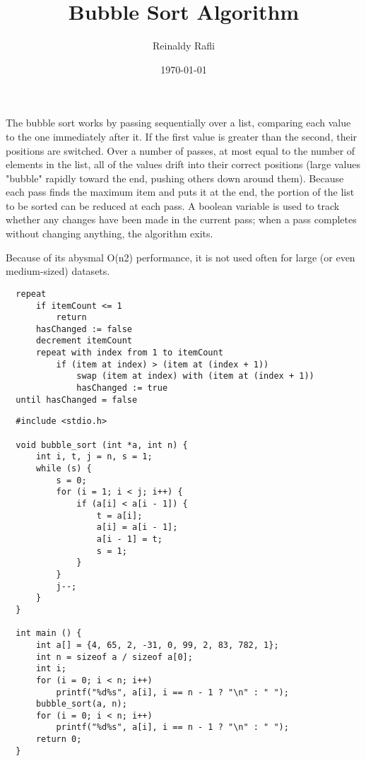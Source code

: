 \documentclass{article}
\author{Reinaldy Rafli}
\date{\today}
\title{Bubble Sort Algorithm}
\begin{document}
\maketitle

The bubble sort works by passing sequentially over a list, comparing each value to the one immediately after it. 
If the first value is greater than the second, their positions are switched. Over a number of passes, at most equal
to the number of elements in the list, all of the values drift into their correct positions (large values "bubble"
rapidly toward the end, pushing others down around them). Because each pass finds the maximum item and puts it
at the end, the portion of the list to be sorted can be reduced at each pass. A boolean variable is used to track 
whether any changes have been made in the current pass; when a pass completes without changing anything, the algorithm exits.

Because of its abysmal O(n2) performance, it is not used often for large (or even medium-sized) datasets.

\begin{verbatim}
  repeat
      if itemCount <= 1
          return
      hasChanged := false
      decrement itemCount
      repeat with index from 1 to itemCount
          if (item at index) > (item at (index + 1))
              swap (item at index) with (item at (index + 1))
              hasChanged := true
  until hasChanged = false
\end{verbatim}

\begin{verbatim}
  #include <stdio.h>
 
  void bubble_sort (int *a, int n) {
      int i, t, j = n, s = 1;
      while (s) {
          s = 0;
          for (i = 1; i < j; i++) {
              if (a[i] < a[i - 1]) {
                  t = a[i];
                  a[i] = a[i - 1];
                  a[i - 1] = t;
                  s = 1;
              }
          }
          j--;
      }
  }
    
  int main () {
      int a[] = {4, 65, 2, -31, 0, 99, 2, 83, 782, 1};
      int n = sizeof a / sizeof a[0];
      int i;
      for (i = 0; i < n; i++)
          printf("%d%s", a[i], i == n - 1 ? "\n" : " ");
      bubble_sort(a, n);
      for (i = 0; i < n; i++)
          printf("%d%s", a[i], i == n - 1 ? "\n" : " ");
      return 0;
  } 
\end{verbatim}
\end{document}
